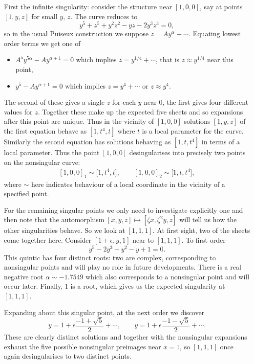 \documentclass[pdftex]{sigma}
\numberwithin{equation}{section}
\begin{document}
First the inf\/inite singularity: consider the structure near $[1,0,0]$,
say at points $[1,y,z]$ for small $y$, $z$. The curve reduces to
\[
  y^5 + z^5 + y^2 z^2 - yz -2y^3 z^3 = 0,
\]
so in the usual Puiseux construction we suppose $z = A y^{\alpha} +
\cdots$. Equating lowest order terms we get one of
\begin{itemize}\itemsep=0pt
\item $A^5 y^{5\alpha} - Ay^{\alpha+1} = 0$ which implies $z =
  y^{1/4}+\cdots$, that is $z\approx y^{1/4}$ near this point,
\item $y^5 - Ay^{\alpha+1} = 0$ which implies $z = y^4 + \cdots$ or $z\approx y^{4}$.
\end{itemize}
The second of these gives a single $z$ for each $y$ near 0, the f\/irst
gives four dif\/ferent values for $z$. Together these make up the
expected f\/ive sheets and so expansions after this point are
unique. Thus in the vicinity of $[1,0,0]$ solutions $[1,y,z]$
of the f\/irst equation behave as $[1, t^4, t]$ where $t$ is a local parameter
for the curve. Similarly the second equation has solutions behaving as $[1,t,t^4]$ in terms of
a local parameter. Thus the point $[1,0,0]$ desingularises into precisely
two points on the nonsingular curve:
\begin{gather}
  \label{eq:inftyExp}
    [1,0,0]_1  \sim \big[1,t^4,t\big], \qquad
    [1,0,0]_2  \sim \big[1,t,t^4\big],
\end{gather}
where $\sim$ here indicates behaviour of a local coordinate in the vicinity of a specif\/ied point.

For the remaining singular points we only need to investigate
explicitly one and then note that the automorphism $[x,y,z] \mapsto
[\zeta x, \zeta^2 y, z]$ will tell us how the other singularities
behave. So we look at $[1,1,1]$. At f\/irst sight, two of the sheets come
together here. Consider $[1+\epsilon,y, 1]$ near to $[1,1,1]$. To
f\/irst order
\begin{equation*}
  y^5- 2y^3 + y^2 - y + 1 = 0.
\end{equation*}
This quintic has four distinct roots: two are complex, corresponding to
nonsingular points and will play no role in future developments. There
is a real negative root $\alpha\sim -1.7549$ which also corresponds
to a nonsingular point and will occur later. Finally, 1 is a root,
which gives us the expected singularity at $[1,1,1]$.

Expanding about this singular point, at the next order we discover
\begin{equation*}
  y = 1 + \epsilon\frac{-1+\sqrt{5}}{2} + \cdots, \qquad
  y = 1 + \epsilon\frac{-1-\sqrt{5}}{2} + \cdots.
\end{equation*}
These are clearly distinct solutions and together with the nonsingular
expansions exhaust the f\/ive possible nonsingular preimages near $x=1$,
so $[1,1,1]$ once again desingularises to two distinct points.
\end{document}
